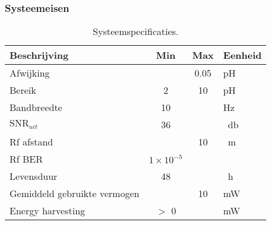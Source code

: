 \begin{frame}
    \frametitle{Systeemeisen}

    \begin{table}[ht]
        \centering
        \begin{tabular}{|l|c c|l|}
            \hline
            Beschrijving                 & Min               & Max   & Eenheid           \\
            \hline 
            Afwijking                    &                   & 0.05  & pH                \\ 
            Bereik                       & 2                 & 10    & pH                \\
            Bandbreedte                  & 10                &       & Hz                \\
            $\mathrm{SNR}_{uit}$         & 36                &       & \qty{}{\decibel}  \\
            Rf afstand                   &                   & 10    & \qty{}{\meter}    \\
            Rf BER                       & $1\times10^{-5}$  &       &                   \\
            Levensduur                   & 48                &       & \qty{}{\hour}     \\
            Gemiddeld gebruikte vermogen &                   & 10    & mW                \\
            Energy harvesting            & $>$ 0             &       & mW                \\
            \hline
        \end{tabular}
        \caption{Systeemspecificaties.}
        \label{tab:systemSpecs}
    \end{table}

\end{frame}